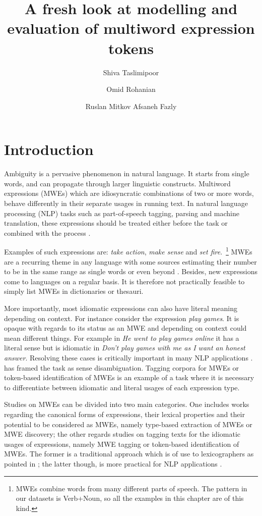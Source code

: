 \documentclass[output=paper
,modfonts
,nonflat]{langsci/langscibook}
\title{A fresh look at modelling and evaluation of multiword expression tokens} %
\author{%
 Shiva Taslimipoor\affiliation{University of Wolverhampton}\and 
 Omid Rohanian\affiliation{University of Wolverhampton}\and 
 Ruslan Mitkov\affiliation{University of Wolverhampton}\lastand
 Afsaneh Fazly\affiliation{Thomson Reuters}
}
\begin{document}
\maketitle
\label{TASLIMIPOOR-CHAPTER}

\section{Introduction} 

Ambiguity is a pervasive phenomenon in natural language. It starts from single words, and can propagate through larger linguistic constructs. Multiword expressions (MWEs) which are idiosyncratic combinations of two or more words, behave differently in their separate usages in running text. In natural language processing (NLP) tasks such as part-of-speech tagging, parsing and machine translation, these expressions should be treated either before the task \citep{nivre2004} or combined with the process \citep{constant2012evaluating,kordoni2011proceedings,nasr:acl:2015}. 

Examples of such expressions are: \textit{take action}, \textit{make sense} and \textit{set fire}.~\footnote{MWEs combine words from many different parts of speech. The pattern in our datasets is Verb+Noun, so all the examples in this chapter are of this kind.} 
MWEs are a recurring theme in any language with some sources estimating their number to be in the same range as single words \citep{Jac97} or even beyond \citep{Sag2002a}. Besides, new expressions come to languages on a regular basis. It is therefore not practically feasible to simply list MWEs in dictionaries or thesauri. 

More importantly, most idiomatic expressions can also have literal meaning depending on context.
For instance consider the expression \textit{play games}. It is opaque with regards to its status as an MWE and depending on context could mean different things. For example in \textit{He went to play games online} it has a literal sense but is idiomatic in \textit{Don’t play games with me as I want an honest answer}. Resolving these cases is critically important in many NLP applications \citep{Katz06automaticidentification}. \cite{Katz06automaticidentification} has framed the task as sense disambiguation. Tagging corpora for MWEs or token-based identification of MWEs is an example of a task where it is necessary to differentiate between idiomatic and literal usages of each expression type. 

Studies on MWEs can be divided into two main categories. One includes works regarding the canonical forms of expressions, their lexical properties and their potential to be considered as MWEs, namely type-based extraction of MWEs or MWE discovery; the other regards studies on tagging texts for the idiomatic usages of expressions, namely MWE tagging or token-based identification of MWEs. The former is a traditional approach which is of use to lexicographers as pointed in \cite{ramisch2014multiword}; the latter though, is more practical for NLP applications \citep{schneider-dimsum:2016}.
\end{document}
